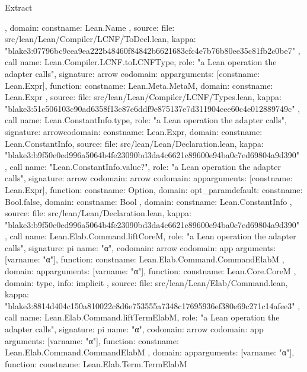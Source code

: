 \begin{lexlean}{Extract}
\begin{toolingmodule}
{{{{        },
        domain: const{name: Lean.Name}
      },
      source: {
        file: src/lean/Lean/Compiler/LCNF/ToDecl.lean,
        kappa: "blake3:07796bc9cea9ea222b48460f84842b6621683cfc4e7b76b80ee35c81fb2c0be7"
      }
    },
    call{
      name: Lean.Compiler.LCNF.toLCNFType,
      role: "a Lean operation the adapter calls",
      signature: arrow{
        codomain: app{arguments: [const{name: Lean.Expr}], function: const{name: Lean.Meta.MetaM}},
        domain: const{name: Lean.Expr}
      },
      source: {
        file: src/lean/Lean/Compiler/LCNF/Types.lean,
        kappa: "blake3:51c506103c90ad6358f13e87e6ddf9e875137e7d311904eee60c4e012889749c"
      }
    },
    call{
      name: Lean.ConstantInfo.type,
      role: "a Lean operation the adapter calls",
      signature: arrow{codomain: const{name: Lean.Expr}, domain: const{name: Lean.ConstantInfo}},
      source: {
        file: src/lean/Lean/Declaration.lean,
        kappa: "blake3:b9f50e0ed996a5064b4fe23090bd3da4c6621c89600e94ba0c7ed69804a9d390"
      }
    },
    call{
      name: "Lean.ConstantInfo.value?",
      role: "a Lean operation the adapter calls",
      signature: arrow{
        codomain: arrow{
          codomain: app{arguments: [const{name: Lean.Expr}], function: const{name: Option}},
          domain: opt_param{default: const{name: Bool.false}, domain: const{name: Bool}}
        },
        domain: const{name: Lean.ConstantInfo}
      },
      source: {
        file: src/lean/Lean/Declaration.lean,
        kappa: "blake3:b9f50e0ed996a5064b4fe23090bd3da4c6621c89600e94ba0c7ed69804a9d390"
      }
    },
    call{
      name: Lean.Elab.Command.liftCoreM,
      role: "a Lean operation the adapter calls",
      signature: pi{
        name: "α",
        codomain: arrow{
          codomain: app{
            arguments: [var{name: "α"}],
            function: const{name: Lean.Elab.Command.CommandElabM}
          },
          domain: app{arguments: [var{name: "α"}], function: const{name: Lean.Core.CoreM}}
        },
        domain: type{},
        info: implicit
      },
      source: {
        file: src/lean/Lean/Elab/Command.lean,
        kappa: "blake3:8814d404c150a810022c8d6e753555a7348c17695936ef380e69c271c14afee3"
      }
    },
    call{
      name: Lean.Elab.Command.liftTermElabM,
      role: "a Lean operation the adapter calls",
      signature: pi{
        name: "α",
        codomain: arrow{
          codomain: app{
            arguments: [var{name: "α"}],
            function: const{name: Lean.Elab.Command.CommandElabM}
          },
          domain: app{arguments: [var{name: "α"}], function: const{name: Lean.Elab.Term.TermElabM}}
}}}}
\end{toolingmodule}
\end{lexlean}

